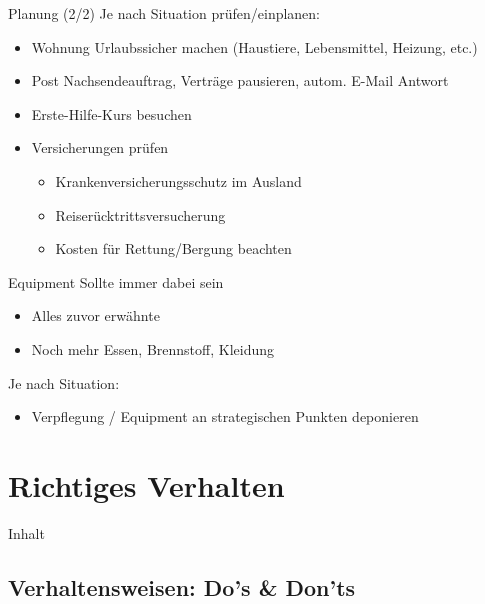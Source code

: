 \documentclass[aspectratio=169]{beamer}
\begin{document}
			\begin{frame}{Planung (2/2)}
				Je nach Situation prüfen/einplanen:
				\begin{itemize}
					\item Wohnung Urlaubssicher machen (Haustiere, Lebensmittel, Heizung, etc.)
					\item Post Nachsendeauftrag, Verträge pausieren, autom. E-Mail Antwort
					\item Erste-Hilfe-Kurs besuchen
					\item Versicherungen prüfen
					\begin{itemize}
						\item Krankenversicherungsschutz im Ausland
						\item Reiserücktrittsversucherung
						\item Kosten für Rettung/Bergung beachten
					\end{itemize}
				\end{itemize}
			\end{frame}
			
			\begin{frame}{Equipment}
				Sollte immer dabei sein
				\begin{itemize}
					\item Alles zuvor erwähnte
					\item Noch mehr Essen, Brennstoff, Kleidung
				\end{itemize}
				Je nach Situation:
				\begin{itemize}
					\item Verpflegung / Equipment an strategischen Punkten deponieren
				\end{itemize}
			\end{frame}
	
	\section{Richtiges Verhalten}
		
		\begin{frame}[t]{Inhalt}
			\linespread{1.4}
		\end{frame}
		
		\subsection{Verhaltensweisen: Do's \& Don'ts}
			
\end{document}
